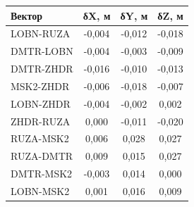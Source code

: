 \begin{table} [htbp]
{\begin{subtable}{.47\linewidth}
\begin{tabular}{ l
					S[table-number-alignment = center]
					S[table-number-alignment = center]
					S[table-number-alignment = center] }
				
				\hline
				\textbf{Вектор}				& \textbf{δX, м}	& \textbf{δY, м}	& \textbf{δZ, м}	\\ \hline
				LOBN-RUZA					&     -0,004		& 	  -0,012		&     -0,018		\\ %
				DMTR-LOBN					&     -0,004		&     -0,003		&     -0,009		\\ %
				DMTR-ZHDR					&     -0,016		&     -0,010		&     -0,013		\\ %
				MSK2-ZHDR					&     -0,006		&     -0,018		&     -0,007		\\ %
				LOBN-ZHDR					&     -0,004		&     -0,002		&      0,002		\\ %
				ZHDR-RUZA					&      0,000		&     -0,011		&     -0,020		\\ %
				RUZA-MSK2					&      0,006		&      0,028		&      0,027		\\ %
				RUZA-DMTR					&      0,009		&      0,015		&      0,027		\\ %
				DMTR-MSK2					&     -0,003		&      0,014		&      0,000		\\ %
				LOBN-MSK2					&      0,001		&      0,016		&      0,009		\\ \hline
				
				
			\end{tabular}
		\end{subtable}%
	}
\end{table}		
